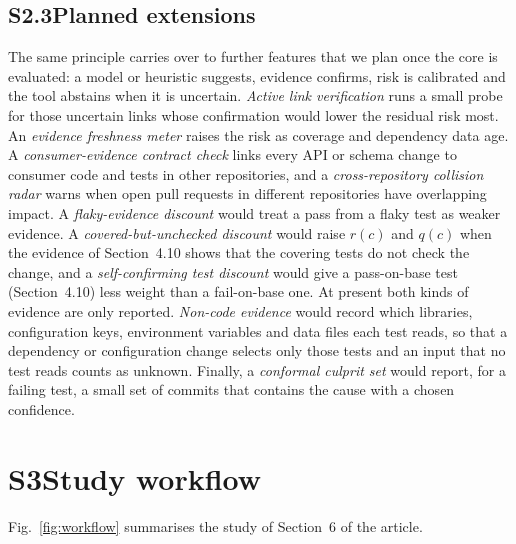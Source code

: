 \documentclass[11pt]{article}
\begin{document}
\subsection*{S2.3\quad Planned extensions}
The same principle carries over to further features that we plan once the core is evaluated: a model or heuristic suggests, evidence confirms, risk is calibrated and the tool abstains when it is uncertain. \emph{Active link verification} runs a small probe for those uncertain links whose confirmation would lower the residual risk most. An \emph{evidence freshness meter} raises the risk as coverage and dependency data age. A \emph{consumer-evidence contract check} links every API or schema change to consumer code and tests in other repositories, and a \emph{cross-repository collision radar} warns when open pull requests in different repositories have overlapping impact. A \emph{flaky-evidence discount} would treat a pass from a flaky test as weaker evidence. A \emph{covered-but-unchecked discount} would raise $r(c)$ and $q(c)$ when the evidence of Section~4.10 shows that the covering tests do not check the change, and a \emph{self-confirming test discount} would give a pass-on-base test (Section~4.10) less weight than a fail-on-base one. At present both kinds of evidence are only reported. \emph{Non-code evidence} would record which libraries, configuration keys, environment variables and data files each test reads, so that a dependency or configuration change selects only those tests and an input that no test reads counts as unknown. Finally, a \emph{conformal culprit set} would report, for a failing test, a small set of commits that contains the cause with a chosen confidence.

\clearpage
\section*{S3\quad Study workflow}
Fig.~\ref{fig:workflow} summarises the study of Section~6 of the article.
\end{document}
